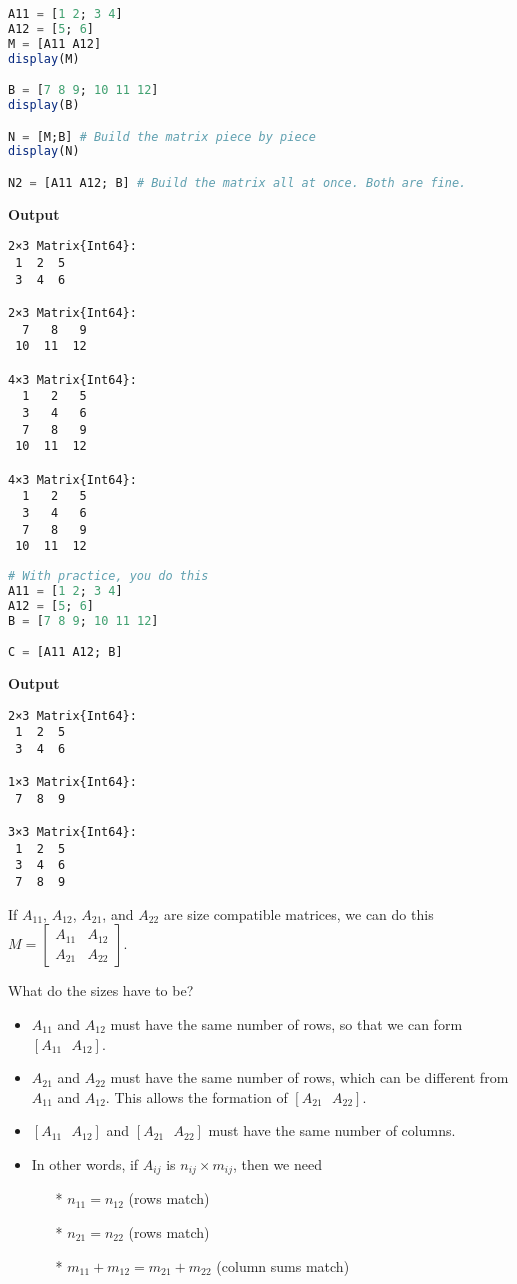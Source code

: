 \begin{lstlisting}[language=Julia,style=mystyle]
A11 = [1 2; 3 4]
A12 = [5; 6]
M = [A11 A12]
display(M)

B = [7 8 9; 10 11 12]
display(B)

N = [M;B] # Build the matrix piece by piece
display(N) 

N2 = [A11 A12; B] # Build the matrix all at once. Both are fine.
\end{lstlisting}
\textbf{Output} 
\begin{verbatim}
2×3 Matrix{Int64}:
 1  2  5
 3  4  6
 
2×3 Matrix{Int64}:
  7   8   9
 10  11  12
 
4×3 Matrix{Int64}:
  1   2   5
  3   4   6
  7   8   9
 10  11  12
 
4×3 Matrix{Int64}:
  1   2   5
  3   4   6
  7   8   9
 10  11  12
\end{verbatim}

\begin{lstlisting}[language=Julia,style=mystyle]
# With practice, you do this
A11 = [1 2; 3 4]
A12 = [5; 6]
B = [7 8 9; 10 11 12]

C = [A11 A12; B] 
\end{lstlisting}
\textbf{Output} 
\begin{verbatim}
2×3 Matrix{Int64}:
 1  2  5
 3  4  6
 
1×3 Matrix{Int64}:
 7  8  9
 
3×3 Matrix{Int64}:
 1  2  5
 3  4  6
 7  8  9
\end{verbatim}

If $A_{11}$, $A_{12}$, $A_{21}$, and $A_{22}$ are size compatible matrices, we can do this
$M = \begin{bmatrix}
    A_{11} & A_{12} \\ A_{21} & A_{22}
\end{bmatrix}.$

What do the sizes have to be?  
\begin{itemize}
    \item $A_{11}$ and $A_{12}$ must have the same number of rows, so that we can form $\left[A_{11} ~~~ A_{12} \right]$.
    \item $A_{21}$ and $A_{22}$ must have the same number of rows, which can be different from $A_{11}$ and $A_{12}$. This allows the formation of $\left[ A_{21} ~~~ A_{22} \right]$.
    \item $\left[A_{11} ~~~ A_{12} \right]$ and $\left[ A_{21} ~~~ A_{22} \right]$ must have the same number of columns. 
    \item In other words, if $A_{ij}$ is $n_{ij} \times m_{ij}$, then we need
    \begin{itemize}
        \item[*] $n_{11} = n_{12}$ (rows match)
        \item[*] $n_{21} = n_{22}$ (rows match)
        \item[*] $m_{11} +m_{12} = m_{21} +m_{22}$ (column sums match)
    \end{itemize}
\end{itemize}

